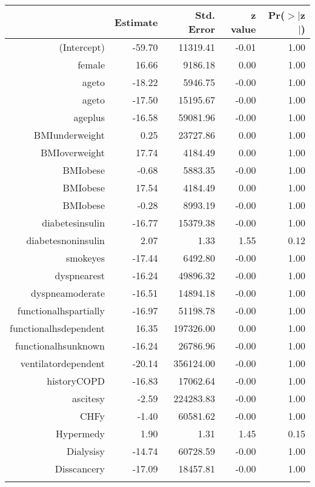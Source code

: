 \bigskip\bigskip
\centering
\begin{tabular}{rrrrr}
  \hline
 & Estimate & Std. Error & z value & Pr($>$$|$z$|$) \\ 
  \hline
(Intercept) & -59.70 & 11319.41 & -0.01 & 1.00 \\ 
  female & 16.66 & 9186.18 & 0.00 & 1.00 \\ 
  age\-65\-to\-74 & -18.22 & 5946.75 & -0.00 & 1.00 \\ 
  age\-75\-to\-84 & -17.50 & 15195.67 & -0.00 & 1.00 \\ 
  age\-85\-plus & -16.58 & 59081.96 & -0.00 & 1.00 \\ 
  BMI\-underweight & 0.25 & 23727.86 & 0.00 & 1.00 \\ 
  BMI\-overweight & 17.74 & 4184.49 & 0.00 & 1.00 \\ 
  BMI\-obese\-1 & -0.68 & 5883.35 & -0.00 & 1.00 \\ 
  BMI\-obese\-2 & 17.54 & 4184.49 & 0.00 & 1.00 \\ 
  BMI\-obese\-3 & -0.28 & 8993.19 & -0.00 & 1.00 \\ 
  diabetes\-insulin & -16.77 & 15379.38 & -0.00 & 1.00 \\ 
  diabetes\-noninsulin & 2.07 & 1.33 & 1.55 & 0.12 \\ 
  smoke\-yes & -17.44 & 6492.80 & -0.00 & 1.00 \\ 
  dyspnea\-rest & -16.24 & 49896.32 & -0.00 & 1.00 \\ 
  dyspnea\-moderate & -16.51 & 14894.18 & -0.00 & 1.00 \\ 
  functional\-hs\-partially & -16.97 & 51198.78 & -0.00 & 1.00 \\ 
  functional\-hs\-dependent & 16.35 & 197326.00 & 0.00 & 1.00 \\ 
  functional\-hs\-unknown & -16.24 & 26786.96 & -0.00 & 1.00 \\ 
  ventilator\-dependent & -20.14 & 356124.00 & -0.00 & 1.00 \\ 
  history\-COPD & -16.83 & 17062.64 & -0.00 & 1.00 \\ 
  ascites\-y & -2.59 & 224283.83 & -0.00 & 1.00 \\ 
  CHF\-y & -1.40 & 60581.62 & -0.00 & 1.00 \\ 
  Hyper\-med\-y & 1.90 & 1.31 & 1.45 & 0.15 \\ 
  Dialysis\-y & -14.74 & 60728.59 & -0.00 & 1.00 \\ 
  Diss\-cancer\-y & -17.09 & 18457.81 & -0.00 & 1.00 \\ 
$$
\end{tabular}
